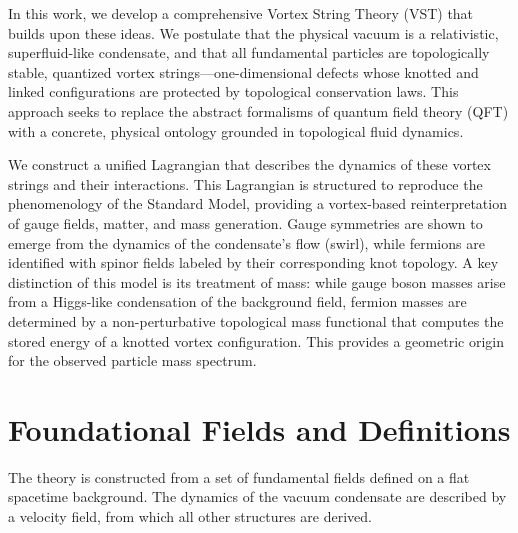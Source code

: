 \documentclass[12pt, a4paper]{article}
\begin{document}
    In this work, we develop a comprehensive Vortex String Theory (VST) that builds upon these ideas. We postulate that the physical vacuum is a relativistic, superfluid-like condensate, and that all fundamental particles are topologically stable, quantized vortex strings—one-dimensional defects whose knotted and linked configurations are protected by topological conservation laws. This approach seeks to replace the abstract formalisms of quantum field theory (QFT) with a concrete, physical ontology grounded in topological fluid dynamics.

    We construct a unified Lagrangian that describes the dynamics of these vortex strings and their interactions. This Lagrangian is structured to reproduce the phenomenology of the Standard Model, providing a vortex-based reinterpretation of gauge fields, matter, and mass generation. Gauge symmetries are shown to emerge from the dynamics of the condensate's flow (swirl), while fermions are identified with spinor fields labeled by their corresponding knot topology. A key distinction of this model is its treatment of mass: while gauge boson masses arise from a Higgs-like condensation of the background field, fermion masses are determined by a non-perturbative topological mass functional that computes the stored energy of a knotted vortex configuration. This provides a geometric origin for the observed particle mass spectrum.

    \section{Foundational Fields and Definitions}

    The theory is constructed from a set of fundamental fields defined on a flat spacetime background. The dynamics of the vacuum condensate are described by a velocity field, from which all other structures are derived.
\end{document}
